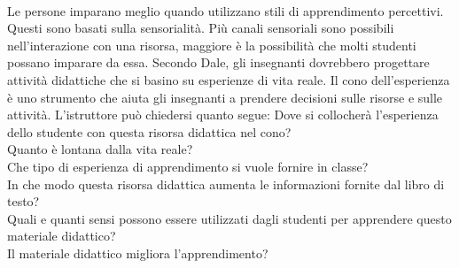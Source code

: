 \\
Le persone imparano meglio quando utilizzano stili di apprendimento percettivi. Questi sono basati sulla sensorialità. Più canali sensoriali sono possibili nell'interazione con una risorsa, maggiore è la possibilità che molti studenti possano imparare da essa. Secondo Dale, gli insegnanti dovrebbero progettare attività didattiche che si basino su esperienze di vita reale.
Il cono dell'esperienza è uno strumento che aiuta gli insegnanti a prendere decisioni sulle risorse e sulle attività. L'istruttore può chiedersi quanto segue: Dove si collocherà l'esperienza dello studente con questa risorsa didattica nel cono?\\
Quanto è lontana dalla vita reale?\\
Che tipo di esperienza di apprendimento si vuole fornire in classe?\\
In che modo questa risorsa didattica aumenta le informazioni fornite dal libro di testo?\\
Quali e quanti sensi possono essere utilizzati dagli studenti per apprendere questo materiale didattico?\\
Il materiale didattico migliora l'apprendimento?\\
